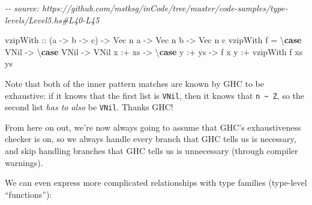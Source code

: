 \documentclass[]{article}
\newenvironment{Shaded}{}{}
\newcommand{\CommentTok}[1]{\textcolor[rgb]{0.38,0.63,0.69}{\textit{#1}}}
\newcommand{\DataTypeTok}[1]{\textcolor[rgb]{0.56,0.13,0.00}{#1}}
\newcommand{\KeywordTok}[1]{\textcolor[rgb]{0.00,0.44,0.13}{\textbf{#1}}}
\newcommand{\NormalTok}[1]{#1}
\newcommand{\OperatorTok}[1]{\textcolor[rgb]{0.40,0.40,0.40}{#1}}
\newcommand{\OtherTok}[1]{\textcolor[rgb]{0.00,0.44,0.13}{#1}}
\begin{document}
\begin{Shaded}
\begin{Highlighting}[]
\CommentTok{{-}{-} source: https://github.com/mstksg/inCode/tree/master/code{-}samples/type{-}levels/Level5.hs\#L40{-}L45}

\OtherTok{vzipWith ::}\NormalTok{ (a }\OtherTok{{-}\textgreater{}}\NormalTok{ b }\OtherTok{{-}\textgreater{}}\NormalTok{ c) }\OtherTok{{-}\textgreater{}} \DataTypeTok{Vec}\NormalTok{ n a }\OtherTok{{-}\textgreater{}} \DataTypeTok{Vec}\NormalTok{ n b }\OtherTok{{-}\textgreater{}} \DataTypeTok{Vec}\NormalTok{ n c}
\NormalTok{vzipWith f }\OtherTok{=}\NormalTok{ \textbackslash{}}\KeywordTok{case}
  \DataTypeTok{VNil} \OtherTok{{-}\textgreater{}}\NormalTok{ \textbackslash{}}\KeywordTok{case}
    \DataTypeTok{VNil} \OtherTok{{-}\textgreater{}} \DataTypeTok{VNil}
\NormalTok{  x }\OperatorTok{:+}\NormalTok{ xs }\OtherTok{{-}\textgreater{}}\NormalTok{ \textbackslash{}}\KeywordTok{case}
\NormalTok{    y }\OperatorTok{:+}\NormalTok{ ys }\OtherTok{{-}\textgreater{}}\NormalTok{ f x y }\OperatorTok{:+}\NormalTok{ vzipWith f xs ys}
\end{Highlighting}
\end{Shaded}

Note that both of the inner pattern matches are known by GHC to be exhaustive:
if it knows that the first list is \texttt{VNil}, then it knows that
\texttt{n\ \textasciitilde{}\ Z}, so the second list \emph{has to also} be
\texttt{VNil}. Thanks GHC!

From here on out, we're now always going to assume that GHC's exhaustiveness
checker is on, so we always handle every branch that GHC tells us is necessary,
and skip handling branches that GHC tells us is unnecessary (through compiler
warnings).

We can even express more complicated relationships with type families
(type-level ``functions''):
\end{document}
